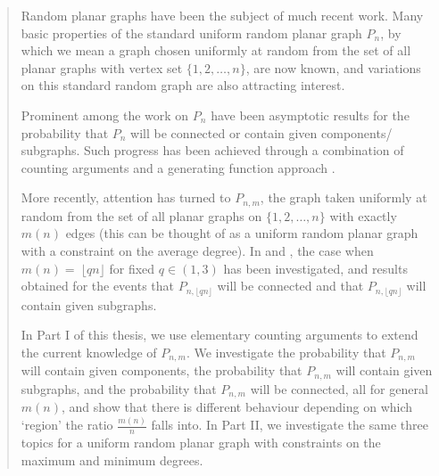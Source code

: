 \documentclass{article}
\newtheorem{Proof of Theorem}{Proof of Theorem}
\begin{document}
\begin{abstract}
Random planar graphs have been the subject of much recent work.
Many basic properties of the standard uniform random planar graph $P_{n}$,
by which we mean a graph chosen uniformly at random 
from the set of all planar graphs with vertex set $ \{ 1,2, \ldots, n \}$,
are now known,
and variations on this standard random graph are also attracting interest.

Prominent among the work on $P_{n}$ have been asymptotic results
for the probability that $P_{n}$ will be connected or contain given components/ subgraphs.
Such progress has been achieved through a combination of counting arguments \cite{mcd}
and a generating function approach \cite{gim}.

More recently,
attention has turned to $P_{n,m}$,
the graph taken uniformly at random from the set of all planar graphs on $\{ 1,2, \ldots, n \}$ with exactly $m(n)$ edges
(this can be thought of as a uniform random planar graph with a constraint on the average degree).
In \cite{ger} and \cite{gim},
the case when $m(n) =~\!\lfloor qn \rfloor$ for fixed $q \in (1,3)$ has been investigated,
and results obtained for the events that 
$P_{n, \lfloor qn \rfloor}$ will be connected
and that $P_{n, \lfloor qn \rfloor}$ will contain given subgraphs.

In Part I of this thesis,
we use elementary counting arguments to extend the current knowledge of $P_{n,m}$.
We investigate the probability that $P_{n,m}$ will contain given components,
the probability that $P_{n,m}$ will contain given subgraphs,
and the probability that $P_{n,m}$ will be connected,
all for general $m(n)$,
and show that there is different behaviour
depending on which `region' the ratio $\frac{m(n)}{n}$ falls into.
In Part II,
we investigate the same three topics for a uniform random planar graph
with constraints on the maximum and minimum degrees. 
\end{abstract}
\end{document}
